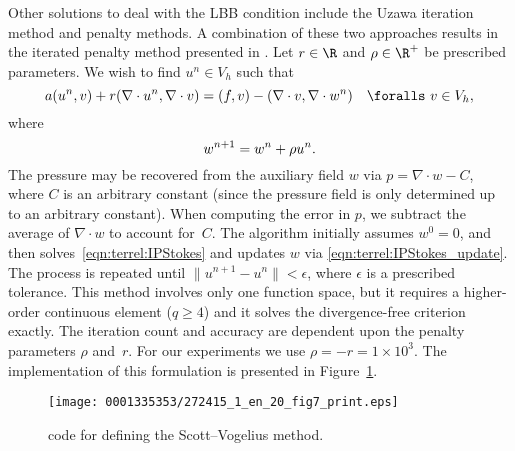 Other solutions to deal with the LBB condition include the Uzawa iteration
method and penalty methods.  A combination of these two approaches results
in the iterated penalty method presented in \citet{ScottVogelius1985}. Let
$r \in \R$ and $\rho \in \R^{+}$ be prescribed parameters. We wish to
find $u^n \in V_{h}$ such that\vspace*{4pt}
\begin{equation}
\label{eqn:terrel:IPStokes}
 a(u^n, v) + r(\nabla \cdot u^n, \nabla \cdot v)
      =  (f, v) - (\nabla\cdot v, \nabla \cdot w^n) \quad \foralls \ v \in V_{h},
\end{equation}
%
where\vspace*{10pt}
%
\begin{equation}
\label{eqn:terrel:IPStokes_update}
   w^{n+1} = w^n + \rho u^n.\vspace*{1.5pt}
\end{equation}
%
The pressure may be recovered from the auxiliary field $w$ via $p =
\nabla\cdot w - C$, where $C$ is an arbitrary constant (since the
pressure field is only determined up to an arbitrary constant).
When computing the error in $p$, we subtract the average of $\nabla
\cdot w$ to account for~$C$. The algorithm initially assumes $w^0 =
0$, and then solves~\eqref{eqn:terrel:IPStokes} and updates $w$ via
\eqref{eqn:terrel:IPStokes_update}. The process is repeated until
$\|u^{n+1} - u^{n}\| < \epsilon$, where $\epsilon$ is a prescribed
tolerance. This method involves only one function space, but it
requires a higher-order continuous element ($q \ge 4$) and it solves
the divergence-free criterion exactly. The iteration count and
accuracy are dependent upon the penalty parameters $\rho$ and~$r$.  For
our experiments we use $\rho = -r = 1 \times 10^{3}$.  The
implementation of this formulation is presented in
Figure~\ref{code:terrel:var:ip}.
%
\begin{figure}[!t]
\bwfig
\texttt{[image: 0001335353/272415\_1\_en\_20\_fig7\_print.eps]}
\caption{\dolfin{} code for defining the Scott--Vogelius method.}
\label{code:terrel:var:ip}
\end{figure}

